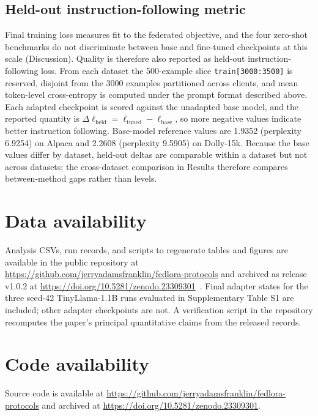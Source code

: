 \documentclass[pdflatex,sn-nature,lineno]{sn-jnl}
\begin{document}
\subsection{Held-out instruction-following metric}
\label{sec:heldout}
Final training loss measures fit to the federated objective, and the four zero-shot benchmarks do not discriminate between base and fine-tuned checkpoints at this scale (Discussion). Quality is therefore also reported as held-out instruction-following loss. From each dataset the 500-example slice \texttt{train[3000:3500]} is reserved, disjoint from the 3000 examples partitioned across clients, and mean token-level cross-entropy is computed under the prompt format described above. Each adapted checkpoint is scored against the unadapted base model, and the reported quantity is $\Delta\ell_{\mathrm{held}} = \ell_{\mathrm{tuned}} - \ell_{\mathrm{base}}$, so more negative values indicate better instruction following. Base-model reference values are 1.9352 (perplexity 6.9254) on Alpaca and 2.2608 (perplexity 9.5905) on Dolly-15k. Because the base values differ by dataset, held-out deltas are comparable within a dataset but not across datasets; the cross-dataset comparison in Results therefore compares between-method gaps rather than levels.

\backmatter

\section*{Data availability}
Analysis CSVs, run records, and scripts to regenerate tables and figures are available in the public repository at \url{https://github.com/jerryadamsfranklin/fedlora-protocols} and archived as release v1.0.2 at \url{https://doi.org/10.5281/zenodo.23309301}~\cite{franklin2026fedloraprotocols}. Final adapter states for the three seed-42 TinyLlama-1.1B runs evaluated in Supplementary Table S1 are included; other adapter checkpoints are not. A verification script in the repository recomputes the paper's principal quantitative claims from the released records.

\section*{Code availability}
Source code is available at \url{https://github.com/jerryadamsfranklin/fedlora-protocols} and archived at \url{https://doi.org/10.5281/zenodo.23309301}.
\end{document}
